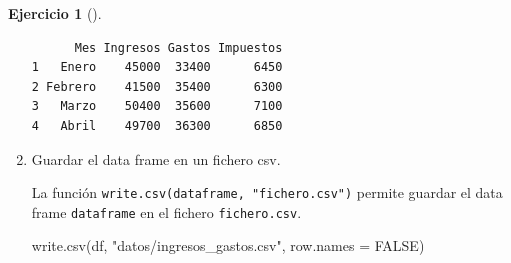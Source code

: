 \documentclass[
  a4paper,
]{scrreport}
\newenvironment{Shaded}{\begin{snugshade}}{\end{snugshade}}
\newcommand{\AttributeTok}[1]{\textcolor[rgb]{0.40,0.45,0.13}{#1}}
\newcommand{\ConstantTok}[1]{\textcolor[rgb]{0.56,0.35,0.01}{#1}}
\newcommand{\FunctionTok}[1]{\textcolor[rgb]{0.28,0.35,0.67}{#1}}
\newcommand{\NormalTok}[1]{\textcolor[rgb]{0.00,0.23,0.31}{#1}}
\newcommand{\StringTok}[1]{\textcolor[rgb]{0.13,0.47,0.30}{#1}}
\theoremstyle{definition}
\newtheorem{exercise}{Ejercicio}[chapter]
\theoremstyle{remark}
\begin{document}
\begin{exercise}[]
\begin{enumerate}
\begin{tcolorbox}
\begin{verbatim}
      Mes Ingresos Gastos Impuestos
1   Enero    45000  33400      6450
2 Febrero    41500  35400      6300
3   Marzo    50400  35600      7100
4   Abril    49700  36300      6850
\end{verbatim}

  \end{tcolorbox}
\item
  Guardar el data frame en un fichero csv.

  \begin{tcolorbox}[enhanced jigsaw, breakable, toptitle=1mm, colbacktitle=quarto-callout-tip-color!10!white, rightrule=.15mm, opacityback=0, opacitybacktitle=0.6, titlerule=0mm, coltitle=black, colframe=quarto-callout-tip-color-frame, colback=white, bottomtitle=1mm, leftrule=.75mm, toprule=.15mm, title=\textcolor{quarto-callout-tip-color}{\faLightbulb}\hspace{0.5em}{Solución}, arc=.35mm, bottomrule=.15mm, left=2mm]

  La función \texttt{write.csv(dataframe,\ "fichero.csv")} permite
  guardar el data frame \texttt{dataframe} en el fichero
  \texttt{fichero.csv}.

\begin{Shaded}
\begin{Highlighting}[]
\FunctionTok{write.csv}\NormalTok{(df, }\StringTok{"datos/ingresos\_gastos.csv"}\NormalTok{, }\AttributeTok{row.names =} \ConstantTok{FALSE}\NormalTok{)}
\end{Highlighting}
\end{Shaded}

  \end{tcolorbox}
\end{enumerate}

\end{exercise}
\end{document}
